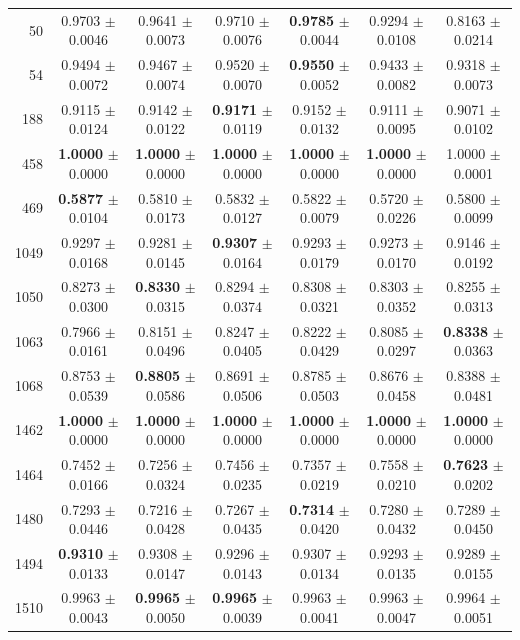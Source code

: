 \begin{table}[t]
\begin{tabular*}{\textwidth}{@{\extracolsep{\fill}}rcccccc@{}}
50 & 0.9703 $\pm$ 0.0046 & 0.9641 $\pm$ 0.0073 & 0.9710 $\pm$ 0.0076 & \textbf{0.9785} $\pm$ 0.0044 & 0.9294 $\pm$ 0.0108 & 0.8163 $\pm$ 0.0214 \\
54 & 0.9494 $\pm$ 0.0072 & 0.9467 $\pm$ 0.0074 & 0.9520 $\pm$ 0.0070 & \textbf{0.9550} $\pm$ 0.0052 & 0.9433 $\pm$ 0.0082 & 0.9318 $\pm$ 0.0073 \\
188 & 0.9115 $\pm$ 0.0124 & 0.9142 $\pm$ 0.0122 & \textbf{0.9171} $\pm$ 0.0119 & 0.9152 $\pm$ 0.0132 & 0.9111 $\pm$ 0.0095 & 0.9071 $\pm$ 0.0102 \\
458 & \textbf{1.0000} $\pm$ 0.0000 & \textbf{1.0000} $\pm$ 0.0000 & \textbf{1.0000} $\pm$ 0.0000 & \textbf{1.0000} $\pm$ 0.0000 & \textbf{1.0000} $\pm$ 0.0000 & 1.0000 $\pm$ 0.0001 \\
469 & \textbf{0.5877} $\pm$ 0.0104 & 0.5810 $\pm$ 0.0173 & 0.5832 $\pm$ 0.0127 & 0.5822 $\pm$ 0.0079 & 0.5720 $\pm$ 0.0226 & 0.5800 $\pm$ 0.0099 \\
1049 & 0.9297 $\pm$ 0.0168 & 0.9281 $\pm$ 0.0145 & \textbf{0.9307} $\pm$ 0.0164 & 0.9293 $\pm$ 0.0179 & 0.9273 $\pm$ 0.0170 & 0.9146 $\pm$ 0.0192 \\
1050 & 0.8273 $\pm$ 0.0300 & \textbf{0.8330} $\pm$ 0.0315 & 0.8294 $\pm$ 0.0374 & 0.8308 $\pm$ 0.0321 & 0.8303 $\pm$ 0.0352 & 0.8255 $\pm$ 0.0313 \\
1063 & 0.7966 $\pm$ 0.0161 & 0.8151 $\pm$ 0.0496 & 0.8247 $\pm$ 0.0405 & 0.8222 $\pm$ 0.0429 & 0.8085 $\pm$ 0.0297 & \textbf{0.8338} $\pm$ 0.0363 \\
1068 & 0.8753 $\pm$ 0.0539 & \textbf{0.8805} $\pm$ 0.0586 & 0.8691 $\pm$ 0.0506 & 0.8785 $\pm$ 0.0503 & 0.8676 $\pm$ 0.0458 & 0.8388 $\pm$ 0.0481 \\
1462 & \textbf{1.0000} $\pm$ 0.0000 & \textbf{1.0000} $\pm$ 0.0000 & \textbf{1.0000} $\pm$ 0.0000 & \textbf{1.0000} $\pm$ 0.0000 & \textbf{1.0000} $\pm$ 0.0000 & \textbf{1.0000} $\pm$ 0.0000 \\
1464 & 0.7452 $\pm$ 0.0166 & 0.7256 $\pm$ 0.0324 & 0.7456 $\pm$ 0.0235 & 0.7357 $\pm$ 0.0219 & 0.7558 $\pm$ 0.0210 & \textbf{0.7623} $\pm$ 0.0202 \\
1480 & 0.7293 $\pm$ 0.0446 & 0.7216 $\pm$ 0.0428 & 0.7267 $\pm$ 0.0435 & \textbf{0.7314} $\pm$ 0.0420 & 0.7280 $\pm$ 0.0432 & 0.7289 $\pm$ 0.0450 \\
1494 & \textbf{0.9310} $\pm$ 0.0133 & 0.9308 $\pm$ 0.0147 & 0.9296 $\pm$ 0.0143 & 0.9307 $\pm$ 0.0134 & 0.9293 $\pm$ 0.0135 & 0.9289 $\pm$ 0.0155 \\
1510 & 0.9963 $\pm$ 0.0043 & \textbf{0.9965} $\pm$ 0.0050 & \textbf{0.9965} $\pm$ 0.0039 & 0.9963 $\pm$ 0.0041 & 0.9963 $\pm$ 0.0047 & 0.9964 $\pm$ 0.0051 \\

\end{tabular*}
\end{table}
